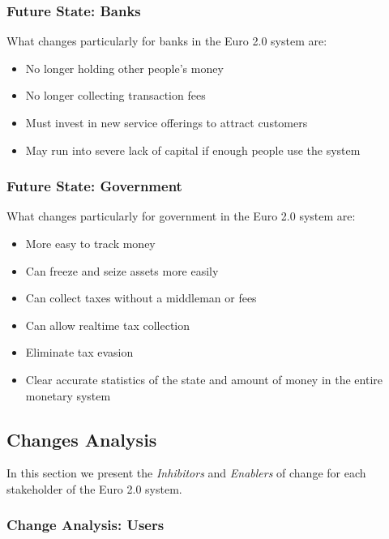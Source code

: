 \documentclass[a4paper,12pt]{article} %
\begin{document}
{\subsubsection{Future State: Banks} \label{sssec:4.4:banks}

What changes particularly for banks in the Euro 2.0 system are:

\begin{itemize}
	\item No longer holding other people's money
	\item No longer collecting transaction fees
	\item Must invest in new service offerings to attract customers
	\item May run into severe lack of capital if enough people use the system
\end{itemize}

\subsubsection{Future State: Government} \label{sssec:4.4:government}

What changes particularly for government in the Euro 2.0 system are:

\begin{itemize}
	\item More easy to track money
	\item Can freeze and seize assets more easily
	\item Can collect taxes without a middleman or fees
	\item Can allow realtime tax collection
	\item Eliminate tax evasion
	\item Clear accurate statistics of the state and amount of money in the entire monetary system
\end{itemize}

\subsection{Changes Analysis} \label{ssec:4.5}

In this section we present the \textit{Inhibitors} and \textit{Enablers} of change for each stakeholder of the Euro 2.0 system.

\subsubsection{Change Analysis: Users} \label{sssec:4.5:users}

}
\end{document}
